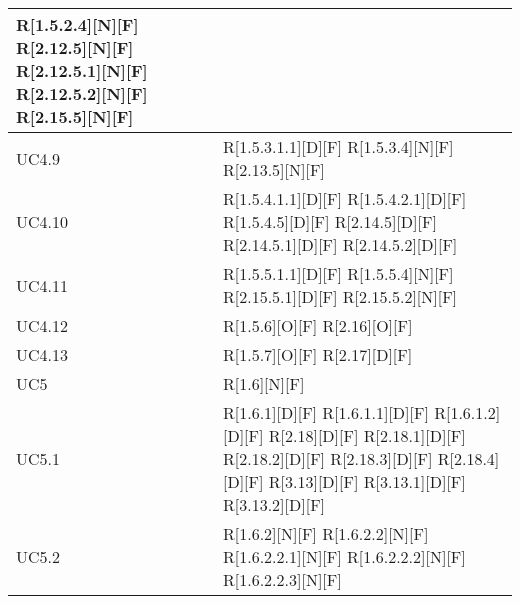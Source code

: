 \begin{longtable}{X | X}
R[1.5.2.4][N][F] \newline
R[2.12.5][N][F] \newline
R[2.12.5.1][N][F] \newline
R[2.12.5.2][N][F] \newline
R[2.15.5][N][F]  \\
\hline
UC4.9 & R[1.5.3.1.1][D][F] \newline
R[1.5.3.4][N][F] \newline
R[2.13.5][N][F]  \\
\hline
UC4.10 & R[1.5.4.1.1][D][F] \newline
R[1.5.4.2.1][D][F] \newline
R[1.5.4.5][D][F] \newline
R[2.14.5][D][F] \newline
R[2.14.5.1][D][F] \newline
R[2.14.5.2][D][F]  \\
\hline
UC4.11 & R[1.5.5.1.1][D][F] \newline
R[1.5.5.4][N][F] \newline
R[2.15.5.1][D][F] \newline
R[2.15.5.2][N][F]  \\
\hline
UC4.12 & R[1.5.6][O][F] \newline
R[2.16][O][F]  \\
\hline
UC4.13 & R[1.5.7][O][F] \newline
R[2.17][D][F]  \\
\hline
UC5 & R[1.6][N][F]  \\
\hline
UC5.1 & R[1.6.1][D][F] \newline
R[1.6.1.1][D][F] \newline
R[1.6.1.2][D][F] \newline
R[2.18][D][F] \newline
R[2.18.1][D][F] \newline
R[2.18.2][D][F] \newline
R[2.18.3][D][F] \newline
R[2.18.4][D][F] \newline
R[3.13][D][F] \newline
R[3.13.1][D][F] \newline
R[3.13.2][D][F]  \\
\hline
UC5.2 & R[1.6.2][N][F] \newline
R[1.6.2.2][N][F] \newline
R[1.6.2.2.1][N][F] \newline
R[1.6.2.2.2][N][F] \newline
R[1.6.2.2.3][N][F] \newline

\end{longtable}
